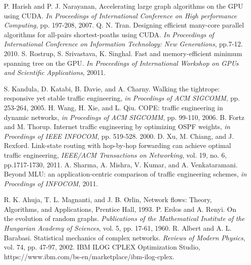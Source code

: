 \documentclass[master]{thesis-uestc}
\begin{document}
\begin{thebibliography}{1}
P. Harish and P. J. Narayanan, Accelerating large graph algorithms on the GPU using CUDA. \emph{In Proceedings of International Conference on High performance Computing}, pp. 197-208, 2007.
Q. N. Tran. Designing efficient many-core parallel algorithms for all-pairs shortest-poaths using CUDA. \emph{In Proceedings of International Conference on Information Technology: New Generations}, pp.7-12. 2010.
S. Rostrup, S. Srivastava, K. Singhal. Fast and memory-efficient minimum spanning tree on the GPU. \emph{In Proceedings of International Workshop on GPUs and Scientific Applications}, 20011.


S. Kandula, D. Katabi, B. Davie, and A. Charny. Walking the tightrope: responsive yet stable traffic engineering, \emph{in Procedings of ACM SIGCOMM}, pp. 253-264, 2005.
H. Wang, H. Xie, and L. Qiu. COPE: traffic engineering in dynamic networks, \emph{in Procedings of ACM SIGCOMM}, pp. 99-110, 2006.
B. Fortz and M. Thorup. Internet traffic engineering by optimizing OSPF weights, \emph{in Procedings of IEEE INFOCOM}, pp. 519-528. 2000.
 D. Xu, M. Chiang, and J. Rexford. Link-state routing with hop-by-hop forwarding can achieve optimal traffic engineering, \emph{IEEE/ACM Transactions on Networking}, vol. 19, no. 6, pp.1717-1730, 2011.
A. Sharma, A. Mishra, V. Kumar, and A. Venkataramani. Beyond MLU: an application-centric comparison of traffic engineering schemes, \emph{in Procedings of INFOCOM}, 2011.

R. K. Ahuja, T. L. Magnanti, and J. B. Orlin, Network flows: Theory, Algorithms, and Applications, Prentice Hall, 1993.
P. Erdos and A. Renyi. On the evolution of random graphs. \emph{Publications of the Mathematical Institute of the Hungarian Academy of
Sciences}, vol. 5, pp. 17-61, 1960.
R. Albert and A. L. Barabasi. Statistical mechanics of complex networks. \emph{Reviews of Modern Physics}, vol. 74, pp. 47-97, 2002.
IBM ILOG CPLEX Optimization Studio, https://www.ibm.com/bs-en/marketplace/ibm-ilog-cplex.


\end{thebibliography}
\end{document}
